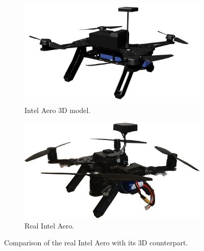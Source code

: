 \begin{figure}[h]
	\centering
	\begin{subfigure}[h]{0.49\textwidth}
		\includegraphics[width=\textwidth]{figure/aero.png}
		\caption{Intel Aero 3D model.}
		\label{fig:aero}
	\end{subfigure}
	\begin{subfigure}[h]{0.49\textwidth}
		\includegraphics[width=\textwidth]{figure/aero_real.jpg}
		\caption{Real Intel Aero.}
	\end{subfigure}
	\caption{Comparison of the real Intel Aero with its 3D counterpart.}
\end{figure}

